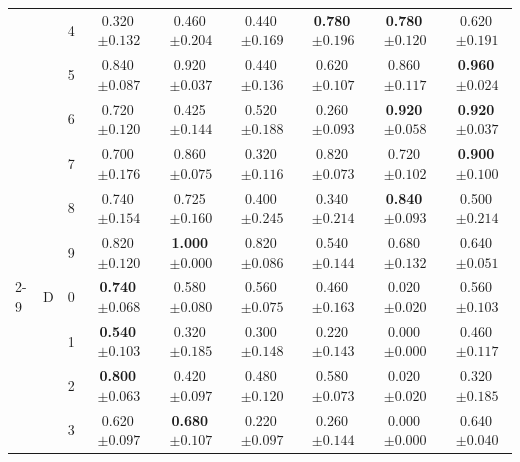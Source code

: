 \begin{longtable}{lllcccccc}
 &  & 4 & 0.320$\,{\scriptstyle\pm0.132}$ & 0.460$\,{\scriptstyle\pm0.204}$ & 0.440$\,{\scriptstyle\pm0.169}$ & \textbf{0.780}$\,{\scriptstyle\pm0.196}$ & \textbf{0.780}$\,{\scriptstyle\pm0.120}$ & 0.620$\,{\scriptstyle\pm0.191}$ \\
 &  & 5 & 0.840$\,{\scriptstyle\pm0.087}$ & 0.920$\,{\scriptstyle\pm0.037}$ & 0.440$\,{\scriptstyle\pm0.136}$ & 0.620$\,{\scriptstyle\pm0.107}$ & 0.860$\,{\scriptstyle\pm0.117}$ & \textbf{0.960}$\,{\scriptstyle\pm0.024}$ \\
 &  & 6 & 0.720$\,{\scriptstyle\pm0.120}$ & 0.425$\,{\scriptstyle\pm0.144}$ & 0.520$\,{\scriptstyle\pm0.188}$ & 0.260$\,{\scriptstyle\pm0.093}$ & \textbf{0.920}$\,{\scriptstyle\pm0.058}$ & \textbf{0.920}$\,{\scriptstyle\pm0.037}$ \\
 &  & 7 & 0.700$\,{\scriptstyle\pm0.176}$ & 0.860$\,{\scriptstyle\pm0.075}$ & 0.320$\,{\scriptstyle\pm0.116}$ & 0.820$\,{\scriptstyle\pm0.073}$ & 0.720$\,{\scriptstyle\pm0.102}$ & \textbf{0.900}$\,{\scriptstyle\pm0.100}$ \\
 &  & 8 & 0.740$\,{\scriptstyle\pm0.154}$ & 0.725$\,{\scriptstyle\pm0.160}$ & 0.400$\,{\scriptstyle\pm0.245}$ & 0.340$\,{\scriptstyle\pm0.214}$ & \textbf{0.840}$\,{\scriptstyle\pm0.093}$ & 0.500$\,{\scriptstyle\pm0.214}$ \\
 &  & 9 & 0.820$\,{\scriptstyle\pm0.120}$ & \textbf{1.000}$\,{\scriptstyle\pm0.000}$ & 0.820$\,{\scriptstyle\pm0.086}$ & 0.540$\,{\scriptstyle\pm0.144}$ & 0.680$\,{\scriptstyle\pm0.132}$ & 0.640$\,{\scriptstyle\pm0.051}$ \\
\cmidrule(lr){2-9}
 & D & 0 & \textbf{0.740}$\,{\scriptstyle\pm0.068}$ & 0.580$\,{\scriptstyle\pm0.080}$ & 0.560$\,{\scriptstyle\pm0.075}$ & 0.460$\,{\scriptstyle\pm0.163}$ & 0.020$\,{\scriptstyle\pm0.020}$ & 0.560$\,{\scriptstyle\pm0.103}$ \\
 &  & 1 & \textbf{0.540}$\,{\scriptstyle\pm0.103}$ & 0.320$\,{\scriptstyle\pm0.185}$ & 0.300$\,{\scriptstyle\pm0.148}$ & 0.220$\,{\scriptstyle\pm0.143}$ & 0.000$\,{\scriptstyle\pm0.000}$ & 0.460$\,{\scriptstyle\pm0.117}$ \\
 &  & 2 & \textbf{0.800}$\,{\scriptstyle\pm0.063}$ & 0.420$\,{\scriptstyle\pm0.097}$ & 0.480$\,{\scriptstyle\pm0.120}$ & 0.580$\,{\scriptstyle\pm0.073}$ & 0.020$\,{\scriptstyle\pm0.020}$ & 0.320$\,{\scriptstyle\pm0.185}$ \\
 &  & 3 & 0.620$\,{\scriptstyle\pm0.097}$ & \textbf{0.680}$\,{\scriptstyle\pm0.107}$ & 0.220$\,{\scriptstyle\pm0.097}$ & 0.260$\,{\scriptstyle\pm0.144}$ & 0.000$\,{\scriptstyle\pm0.000}$ & 0.640$\,{\scriptstyle\pm0.040}$ \\

\end{longtable}
